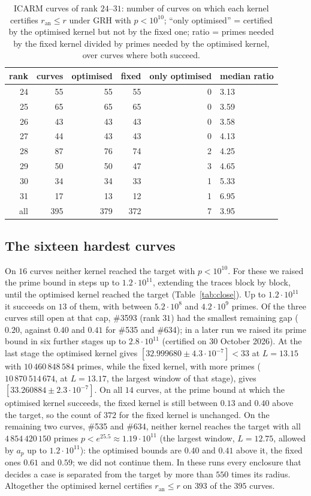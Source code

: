 \documentclass[11pt]{amsart}
\theoremstyle{remark}
\theoremstyle{definition}
\newcommand{\ran}{r_{\mathrm{an}}}
\begin{document}
\begin{table}[!ht]
\centering\small
\begin{tabular}{rrrrrl}
\toprule
rank & curves & optimised & fixed & only optimised & median ratio\\
\midrule
24 & 55 & 55 & 55 & 0 & 3.13\\
25 & 65 & 65 & 65 & 0 & 3.59\\
26 & 43 & 43 & 43 & 0 & 3.58\\
27 & 44 & 43 & 43 & 0 & 4.13\\
28 & 87 & 76 & 74 & 2 & 4.25\\
29 & 50 & 50 & 47 & 3 & 4.65\\
30 & 34 & 34 & 33 & 1 & 5.33\\
31 & 17 & 13 & 12 & 1 & 6.95\\
\midrule
all & 395 & 379 & 372 & 7 & 3.95\\
\bottomrule
\end{tabular}
\caption{ICARM curves of rank $24$--$31$: number of curves on which each kernel certifies $\ran\le r$ under GRH with $p<10^{10}$; ``only optimised'' = certified by the optimised kernel but not by the fixed one; ratio = primes needed by the fixed kernel divided by primes needed by the optimised kernel, over curves where both succeed.}
\label{tab:board}
\end{table}

\subsection*{The sixteen hardest curves}
On $16$ curves neither kernel reached the target with $p<10^{10}$. For these we raised the prime bound in steps up to $1.2\cdot10^{11}$, extending the traces block by block, until the optimised kernel reached the target (Table~\ref{tab:close}). Up to $1.2\cdot10^{11}$ it succeeds on $13$ of them, with between $5.2\cdot10^{8}$ and $4.2\cdot10^{9}$ primes. Of the three curves still open at that cap, \#3593 (rank $31$) had the smallest remaining gap ($0.20$, against $0.40$ and $0.41$ for \#535 and \#634); in a later run we raised its prime bound in six further stages up to $2.8\cdot10^{11}$ (certified on 30 October 2026). At the last stage the optimised kernel gives $[32.999680\pm4.3\cdot10^{-7}]<33$ at $L=13.15$ with $10\,460\,848\,584$ primes, while the fixed kernel, with more primes ($10\,870\,514\,674$, at $L=13.17$, the largest window of that stage), gives $[33.260884\pm2.3\cdot10^{-7}]$. On all $14$ curves, at the prime bound at which the optimised kernel succeeds, the fixed kernel is still between $0.13$ and $0.40$ above the target, so the count of $372$ for the fixed kernel is unchanged. On the remaining two curves, \#535 and \#634, neither kernel reaches the target with all $4\,854\,420\,150$ primes $p<e^{25.5}\approx1.19\cdot10^{11}$ (the largest window, $L=12.75$, allowed by $a_p$ up to $1.2\cdot10^{11}$): the optimised bounds are $0.40$ and $0.41$ above it, the fixed ones $0.61$ and $0.59$; we did not continue them. In these runs every enclosure that decides a case is separated from the target by more than $550$ times its radius. Altogether the optimised kernel certifies $\ran\le r$ on $393$ of the $395$ curves.
\end{document}
